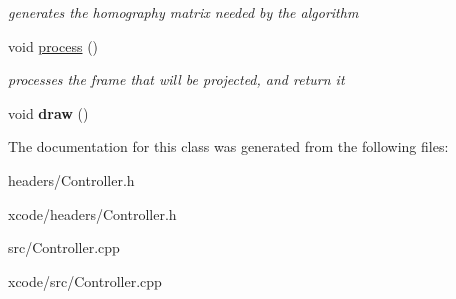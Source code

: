 \begin{DoxyCompactItemize}
\begin{DoxyCompactList}\small\item\em generates the homography matrix needed by the algorithm \end{DoxyCompactList}\item 
\hypertarget{class_controller_a7ac58195c3342b7de52b762c0d759a3c}{void \hyperlink{class_controller_a7ac58195c3342b7de52b762c0d759a3c}{process} ()}\label{class_controller_a7ac58195c3342b7de52b762c0d759a3c}

\begin{DoxyCompactList}\small\item\em processes the frame that will be projected, and return it \end{DoxyCompactList}\item 
\hypertarget{class_controller_a02fdbce18ccb7becaa2aa9fd8fc4aa2b}{void {\bfseries draw} ()}\label{class_controller_a02fdbce18ccb7becaa2aa9fd8fc4aa2b}

\end{DoxyCompactItemize}


The documentation for this class was generated from the following files\-:\begin{DoxyCompactItemize}
\item 
headers/Controller.\-h\item 
xcode/headers/Controller.\-h\item 
src/Controller.\-cpp\item 
xcode/src/Controller.\-cpp\end{DoxyCompactItemize}
